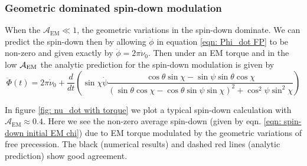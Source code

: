 \documentclass[/home/greg/Thesis/main/main.tex]{subfiles}
\begin{document}
\subsubsection{Geometric dominated spin-down modulation}
When the $\mathcal{A}_{\mathrm{EM}} \ll 1$, the geometric variations
in the spin-down dominate. We can predict the spin-down then by allowing 
$\ddot{\phi}$ in equation \eqref{eqn: Phi_dot FP} to be non-zero and given
exactly by $\ddot{\phi} = 2\pi \dot{\nu}_{0}$. Then under an EM torque and 
in the low $\mathcal{A}_{\mathrm{EM}}$ the analytic prediction for the spin-down modulation is
given by 
\begin{equation}
    \ddot{\Phi}(t) = 2\pi \dot{\nu}_{0} + \frac{d}{dt}\left(
        \sin\chi\dot{\psi} \frac{\cos\theta\sin\chi - \sin \psi \sin \theta \cos\chi 
}{(\sin\theta \cos \chi - \cos \theta \sin \psi \sin \chi)^{2} + \cos^{2}\psi \sin^{2} \chi}
\right)
\label{eqn : 1238}
\end{equation}

In figure \ref{fig: nu_dot with torque} we plot a typical spin-down calculation
with $\mathcal{A}_{\mathrm{EM}} \approx 0.4$. Here we see  
the non-zero average spin-down (given by eqn. \eqref{eqn: spin-down initial EM chi})
due to EM torque modulated by the geometric variations of free precession. The
black (numerical results) and dashed red lines (analytic prediction) show good agreement.
\begin{figure}[htb]
\begin{floatrow}
\capbtabbox{%
  
}{%
  \caption{}%
  \label{tab:}
}
\end{floatrow}
\end{figure}

\FloatBarrier
\end{document}
